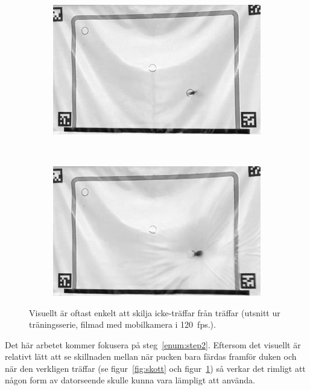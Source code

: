 \documentclass[a4paper,12pt]{article}
\begin{document}
\begin{figure}[ht]
  \centering
  \begin{subfigure}[t]{\textwidth}
    \centering
    \includegraphics[width=\linewidth]{photos/canvas-not-hit.jpg}
  \end{subfigure} \\[1cm]
  \begin{subfigure}[t]{\textwidth}
    \centering
    \includegraphics[width=\linewidth]{photos/canvas-hit.jpg}
  \end{subfigure}%
  \caption{Visuellt är oftast enkelt att skilja icke-träffar från
    träffar (utsnitt ur träningsserie, filmad med mobilkamera i
    120~fps.).\label{fig:hit-not-hit}}
\end{figure}

Det här arbetet kommer fokusera på steg~\ref{enum:step2}. Eftersom det
visuellt är relativt lätt att se skillnaden mellan när pucken bara färdas
framför duken och när den verkligen träffar (se figur~\ref{fig:skott} och
figur~\ref{fig:hit-not-hit}) så verkar det rimligt att någon form av
datorseende skulle kunna vara lämpligt att använda.
\end{document}
